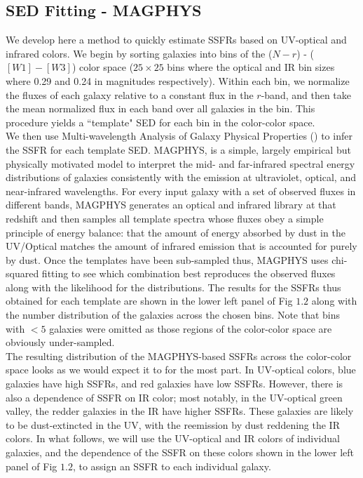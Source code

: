 \subsection{SED Fitting - MAGPHYS}
We develop here a method to quickly estimate SSFRs based on UV-optical and infrared colors. We begin by sorting galaxies into bins of the ($N-r$) - ($[W1]-[W3]$) color space ($25\times25$ bins where the optical and IR bin sizes where 0.29 and 0.24 in magnitudes respectively). Within each bin, we normalize the fluxes of each galaxy relative to a constant flux in the $r$-band, and then take the mean normalized flux in each band over all galaxies in the bin. This procedure yields a ``template" SED for each bin in the color-color space.\\
We then use Multi-wavelength Analysis of Galaxy Physical Properties (\citet{da_cunha_simple_2008}) to infer the SSFR for each template SED. MAGPHYS, is a simple, largely empirical but physically motivated model to interpret the mid- and far-infrared spectral energy distributions of galaxies consistently with the emission at ultraviolet, optical, and near-infrared wavelengths. For every input galaxy with a set of observed fluxes in different bands, MAGPHYS generates an optical and infrared library at that redshift and then samples all template spectra whose fluxes obey a simple principle of energy balance: that the amount of energy absorbed by dust in the UV/Optical matches the amount of infrared emission that is accounted for purely by dust. Once the templates have been sub-sampled thus, MAGPHYS uses chi-squared fitting to see which combination best reproduces the observed fluxes along with the likelihood for the distributions. The results for the SSFRs thus obtained for each template are shown in the lower left panel of Fig $1.2$ along with the number distribution of the galaxies across the chosen bins. Note that bins with $< 5$ galaxies were omitted as those regions of the color-color space are obviously under-sampled.\\

The resulting distribution of the MAGPHYS-based SSFRs across the color-color space looks as we would expect it to for the most part. In UV-optical colors, blue galaxies have high SSFRs, and red galaxies have low SSFRs. However, there is also a dependence of SSFR on IR color; most notably, in the UV-optical green valley, the redder galaxies in the IR have higher SSFRs. These galaxies are likely to be dust-extincted in the UV, with the reemission by dust reddening the IR colors. In what follows, we will use the UV-optical and IR colors of individual galaxies, and the dependence of the SSFR on these colors shown in the lower left panel of Fig $1.2$, to assign an SSFR to each individual galaxy.\\

